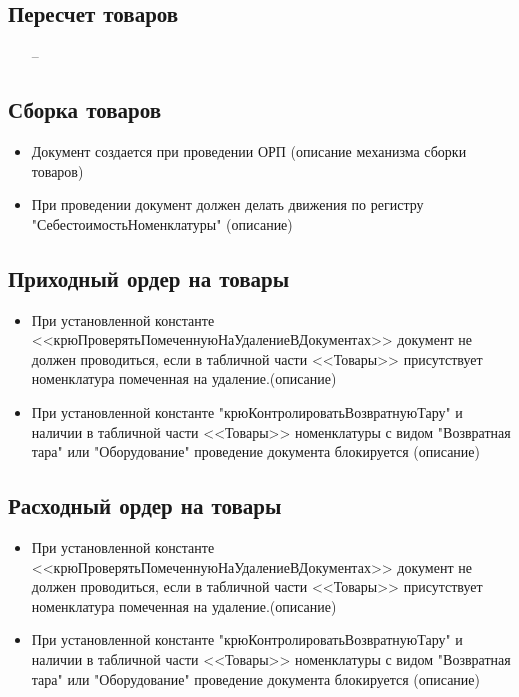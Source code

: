 \subsection{Пересчет товаров}
\begin{itemize}
	\item [--]
\end{itemize}


\subsection{Сборка товаров}
\begin{itemize}
	\item Документ создается при проведении ОРП (описание механизма сборки товаров)
	\item При проведении документ должен делать движения по регистру "СебестоимостьНоменклатуры" (описание)
\end{itemize}



\subsection{Приходный ордер на товары}
\begin{itemize}
	\item При установленной константе <<крюПроверятьПомеченнуюНаУдалениеВДокументах>>
	документ не должен проводиться, если в табличной части <<Товары>> присутствует 
	номенклатура помеченная на удаление.(описание)
	\item При установленной константе "крюКонтролироватьВозвратнуюТару" и наличии в табличной части <<Товары>> номенклатуры
	с видом "Возвратная тара" или "Оборудование" проведение документа блокируется (описание)
\end{itemize}


\subsection{Расходный ордер на товары}
\begin{itemize}
	\item При установленной константе <<крюПроверятьПомеченнуюНаУдалениеВДокументах>>
	документ не должен проводиться, если в табличной части <<Товары>> присутствует 
	номенклатура помеченная на удаление.(описание)
	\item При установленной константе "крюКонтролироватьВозвратнуюТару" и наличии в табличной части <<Товары>> номенклатуры
	с видом "Возвратная тара" или "Оборудование" проведение документа блокируется (описание)
\end{itemize}


